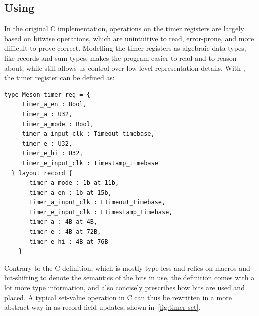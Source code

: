 \subsection{Using \dargent}
In the original C implementation, operations on the timer registers are largely based on
bitwise operations, which are unintuitive to read, error-prone, and more difficult to prove correct. Modelling the timer registers as algebraic
data types, like records and sum types,
makes the program easier to read and to reason about, while \dargent still allows us control over low-level representation details. 
%
With \dargent, the timer register can be defined as:
\begin{lstlisting}[language=Cogent]
  type Meson_timer_reg = {
     timer_a_en : Bool,
     timer_a : U32,
     timer_a_mode : Bool,
     timer_a_input_clk : Timeout_timebase,
     timer_e : U32,
     timer_e_hi : U32,
     timer_e_input_clk : Timestamp_timebase
  } layout record {
       timer_a_mode : 1b at 11b,
       timer_a_en : 1b at 15b,
       timer_a_input_clk : LTimeout_timebase,
       timer_e_input_clk : LTimestamp_timebase,
       timer_a : 4B at 4B,
       timer_e : 4B at 72B,
       timer_e_hi : 4B at 76B
    }
\end{lstlisting}
Contrary to the C definition, which is mostly type-less and relies on macros and bit-shifting
to denote the semantics of the bits in use, the \cogent definition comes with a lot more
type information, and also concisely prescribes how bits are used and placed.
A typical set-value operation in C can thus be rewritten in a more abstract way in \cogent as
record field updates, shown in~\autoref{fig:timer-set}.



%   
  
